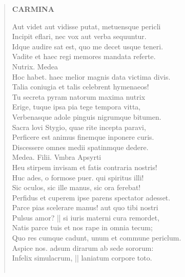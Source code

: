 \documentclass[11pt, a4paper]{report}
\begin{document}
\begin{verse}
    \begin{center} \textbf{CARMINA} \end{center} \marginpar{[76]} Aut videt aut vidisse putat, metuensque pericli \\ Incipit eflari, nec vox aut verba sequuntur. \\ Idque audire sat est, quo me decet usque teneri. \\ Vadite et haec regi memores mandata referte. \\ Nutrix. Medea \\ Hoc habet. haec melior magnis data victima divis. \\ Talia coniugia et talis celebrent hymenaeos! \\ Tu secreta pyram natorum maxima nutrix \\ Erige,  \lbrack  tuque ipsa pia tege tempora vitta, \\ Verbenasque adole pinguis nigrumque bitumen. \\ Sacra lovi Stygio, quae rite incepta paravi, \\ Perficere est animus finemque inponere curis. \\ Discessere omnes medii spatinmque dedere. \\ Medea. Filii. Vmbra Apsyrti \\ Heu stirpem invisam et fatis contraria nostris! \\ Huc ades, o formose puer. qui spiritus illi! \\ Sic oculos, sic ille manus, sic ora ferebat! \\ Perfidus et cuperem ipse parens spectator adesset. \\ Parce pias scelerare manus! aut quo tibi nostri \\ Pulsus amor? || si iuris materni cura remordet, \\ Natis parce tuis et nos rape in omnia tecum; \\ Quo res cumque cadunt, unum et commune periclum. \\ Aspice nos. adsum dirarum ab sede sororum:  \\ Infelix simulacrum, || laniatum corpore toto. \\ 
        ﻿\pagebreak 

\end{verse}
\end{document}

